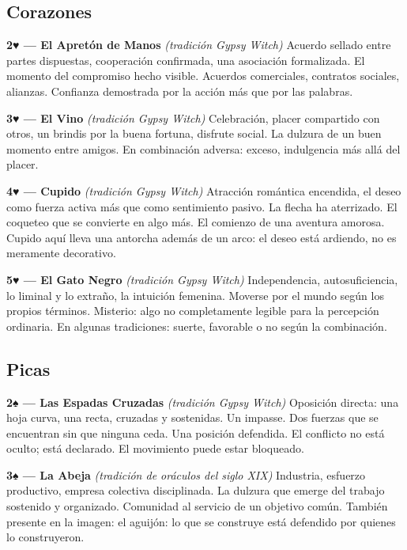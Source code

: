 \subsection{Corazones}\label{hearts}

\textbf{2♥ --- El Apretón de Manos} \emph{(tradición Gypsy Witch)} Acuerdo sellado entre partes dispuestas, cooperación confirmada, una asociación formalizada. El momento del compromiso hecho visible. Acuerdos comerciales, contratos sociales, alianzas. Confianza demostrada por la acción más que por las palabras.

\textbf{3♥ --- El Vino} \emph{(tradición Gypsy Witch)} Celebración, placer compartido con otros, un brindis por la buena fortuna, disfrute social. La dulzura de un buen momento entre amigos. En combinación adversa: exceso, indulgencia más allá del placer.

\textbf{4♥ --- Cupido} \emph{(tradición Gypsy Witch)} Atracción romántica encendida, el deseo como fuerza activa más que como sentimiento pasivo. La flecha ha aterrizado. El coqueteo que se convierte en algo más. El comienzo de una aventura amorosa. Cupido aquí lleva una antorcha además de un arco: el deseo está ardiendo, no es meramente decorativo.

\textbf{5♥ --- El Gato Negro} \emph{(tradición Gypsy Witch)} Independencia, autosuficiencia, lo liminal y lo extraño, la intuición femenina. Moverse por el mundo según los propios términos. Misterio: algo no completamente legible para la percepción ordinaria. En algunas tradiciones: suerte, favorable o no según la combinación.

\subsection{Picas}\label{spades}

\textbf{2♠ --- Las Espadas Cruzadas} \emph{(tradición Gypsy Witch)} Oposición directa: una hoja curva, una recta, cruzadas y sostenidas. Un impasse. Dos fuerzas que se encuentran sin que ninguna ceda. Una posición defendida. El conflicto no está oculto; está declarado. El movimiento puede estar bloqueado.

\textbf{3♠ --- La Abeja} \emph{(tradición de oráculos del siglo XIX)} Industria, esfuerzo productivo, empresa colectiva disciplinada. La dulzura que emerge del trabajo sostenido y organizado. Comunidad al servicio de un objetivo común. También presente en la imagen: el aguijón: lo que se construye está defendido por quienes lo construyeron.

